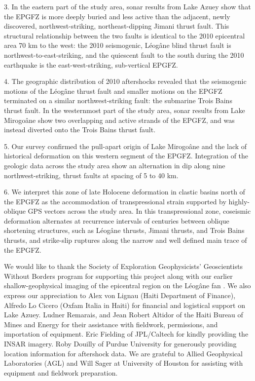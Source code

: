 \documentclass[linenumbers,draft]{agujournal}
\begin{document}
3. In the eastern part of the study area, sonar results from Lake Azuey show that the EPGFZ is more deeply buried and less active than the adjacent, newly discovered, northwest-striking, northeast-dipping Jimani thrust fault. This structural relationship between the two faults is identical to the 2010 epicentral area 70 km to the west: the 2010 seismogenic, L\'eog\^ane blind thrust fault is northwest-to-east-striking, and the quiescent fault to the south during the 2010 earthquake is the east-west-striking, sub-vertical EPGFZ. 

4. The geographic distribution of 2010 aftershocks revealed that the seismogenic motions of the L\'eog\^ane thrust fault and smaller motions on the EPGFZ terminated on a similar northwest-striking fault: the submarine Trois Bains thrust fault. In the westernmost part of the study area, sonar results from Lake Mirogo\^ane show two overlapping and active strands of the EPGFZ, and was instead diverted onto the Trois Bains thrust fault.

5. Our survey confirmed the pull-apart origin of Lake Mirogo\^ane and the lack of historical deformation on this western segment of the EPGFZ. Integration of the geologic data across the study area show an alternation in dip along nine northwest-striking, thrust faults at spacing of 5 to 40 km.

6.  We interpret this zone of late Holocene deformation in clastic basins north of the EPGFZ as the accommodation of transpressional strain supported by highly-oblique GPS vectors across the study area. In this transpressional zone, coseismic deformation alternates at recurrence intervals of centuries between oblique shortening structures, such as L\'eog\^ane thrusts, Jimani thrusts, and Trois Bains thrusts, and strike-slip ruptures along the narrow and well defined main trace of the EPGFZ.
 
\acknowledgments
We would like to thank the Society of Exploration Geophysicists' Geoscientists Without Borders program for supporting this project along with our earlier shallow-geophysical imaging of the epicentral region on the L\'eog\^ane fan \citep{kocel2016near}. We also express our appreciation to Alex von Lignau (Haiti Department of Finance), Alfredo Lo Cicero (Oxfam Italia in Haiti) for financial and logistical support on Lake Azuey. Ludner Remarais, and Jean Robert Altidor of the Haiti Bureau of Mines and Energy for their assistance with fieldwork, permissions, and importation of equipment. Eric Fielding of JPL/Caltech for kindly providing the INSAR imagery. Roby Douilly of Purdue University for generously providing location information for aftershock data. We are grateful to Allied Geophysical Laboratories (AGL) and Will Sager at University of Houston for assisting with equipment and fieldwork preparation.
\end{document}
